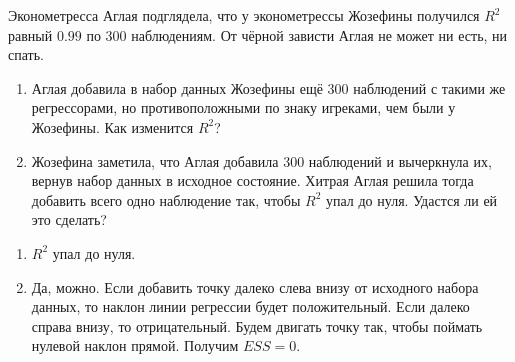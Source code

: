 \begin{problem}
Эконометресса Аглая подглядела, что у эконометрессы Жозефины получился $R^2$ равный $0.99$ по 300 наблюдениям. От чёрной зависти Аглая не может ни есть, ни спать.

\begin{enumerate}
\item Аглая добавила в набор данных Жозефины ещё 300 наблюдений с такими же регрессорами, но противоположными по знаку игреками, чем были у Жозефины. Как изменится $R^2$?
\item Жозефина заметила, что Аглая добавила 300 наблюдений и вычеркнула их, 
вернув набор данных в исходное состояние. Хитрая Аглая решила тогда добавить всего одно наблюдение так, чтобы $R^2$ упал до нуля. 
Удастся ли ей это сделать?
\end{enumerate}


\begin{sol}
\begin{enumerate}
\item $R^2$ упал до нуля.
\item Да, можно. Если добавить точку далеко слева внизу от исходного набора данных, то наклон линии регрессии будет положительный. Если далеко справа внизу, то отрицательный. Будем двигать точку так, чтобы поймать нулевой наклон прямой. Получим $ESS=0$.
\end{enumerate}
\end{sol}
\end{problem}


